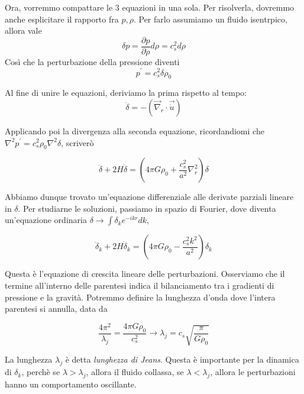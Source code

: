 \documentclass{report}
\begin{document}
Ora, vorremmo compattare le 3 equazioni in una sola. Per risolverla, dovremmo anche esplicitare il rapporto fra $p, \rho$. Per farlo assumiamo un fluido isentrpico, allora vale 
\begin{equation}
    \delta p = \frac{\partial p}{\partial \rho}d\rho = c_s^2 d\rho
\end{equation}
Così che la perturbazione della pressione diventi
\begin{equation}
    p^{'} = c_s^2\delta\rho_0
\end{equation}

Al fine di unire le equazioni, deriviamo la prima rispetto al tempo: 
\begin{equation}
    \ddot{\delta} = -(\vec{\nabla}_r \cdot \vec{\dot{u}})
\end{equation}

Applicando poi la divergenza alla seconda equazione, ricordandiomi che $\nabla^2 p^{'} = c_s^2\rho_0 \nabla^2\delta$, scriverò

\begin{equation}
    \ddot{\delta} + 2H\dot{\delta} = \left(4\pi G \rho_0 + \frac{c_s^2}{a^2}\nabla^2_r\right)\delta
\end{equation}

Abbiamo dunque trovato un'equazione differenziale alle derivate parziali lineare in $\delta$. Per studiarne le soluzioni, passiamo in spazio di Fourier, dove diventa un'equazione ordinaria $\delta \rightarrow \int \delta_k e^{-ikr}dk$, 

\begin{tcolorbox}[colback=gray!15, colframe=black, boxrule=1pt]
\begin{equation}
    \label{linear_growth_equation}
    \ddot{\delta}_k + 2H\dot{\delta}_k = \left(4\pi G \rho_0 - \frac{c_s^2k^2}{a^2}\right)\delta_k
\end{equation}
\end{tcolorbox}

Questa è l'equazione di crescita lineare delle perturbazioni. Osserviamo che il termine all'interno delle parentesi indica il bilanciamento tra i gradienti di pressione e la gravità. Potremmo definire la lunghezza d'onda dove l'intera parentesi si annulla, data da 

\begin{equation}
    \frac{4\pi^2}{\lambda_j} = \frac{4\pi G\rho_0}{c_s^2} \rightarrow \lambda_j = c_s\sqrt{\frac{\pi}{G\rho_0}}
\end{equation}

La lunghezza $\lambda_j$ è detta \emph{lunghezza di Jeans}. Questa è importante per la dinamica di $\delta_k$, perchè se $\lambda > \lambda_j$, allora il fluido collassa, se $\lambda < \lambda_j$, allora le perturbazioni hanno un comportamento oscillante. \\
\end{document}
